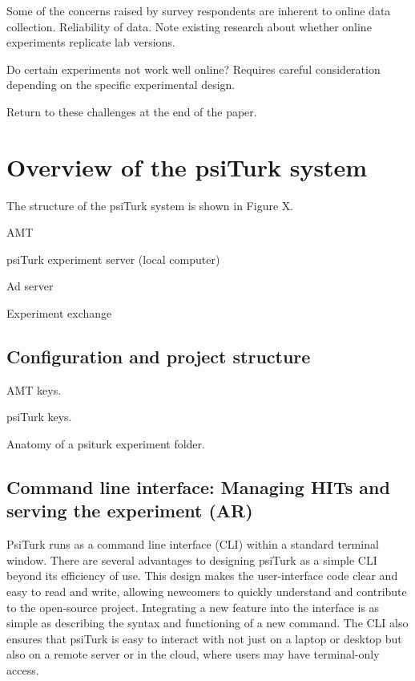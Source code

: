 \documentclass[twocolumn]{svjour3}          %
\begin{document}
Some of the concerns raised by survey respondents are inherent to online data collection.
Reliability of data. 
Note existing research about whether online experiments replicate lab versions.

Do certain experiments not work well online?
Requires careful consideration depending on the specific experimental design.

Return to these challenges at the end of the paper.





\section{Overview of the psiTurk system}

The structure of the psiTurk system is shown in Figure X.

AMT

psiTurk experiment server (local computer)

Ad server

Experiment exchange

\subsection{Configuration and project structure}

AMT keys.

psiTurk keys.

Anatomy of a psiturk experiment folder.


\subsection{Command line interface: Managing HITs and serving the experiment (AR)}

PsiTurk runs as a command line interface (CLI) within a standard terminal window.
There are several advantages to designing psiTurk as a simple CLI beyond its efficiency of use. This
design makes the user-interface code clear and easy to read and write, allowing newcomers to quickly
understand and contribute to the open-source project. Integrating a new feature into the interface
is as simple as describing the syntax and functioning of a new command. The CLI also ensures that
psiTurk is easy to interact with not just on a laptop or desktop but also on a remote server or in
the cloud, where users may have terminal-only access.
 
\end{document}
